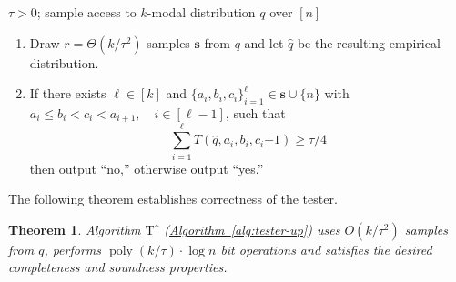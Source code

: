 \documentclass[10pt]{article}
\newtheorem{theorem}{Theorem}[section]
\theoremstyle{definition}
\numberwithin{equation}{section}
\newcommand{\expref}[2]{\texorpdfstring{\hyperref[#2]{#1~\ref{#2}}}{#1~\ref{#2}}}
\newcommand{\algorithml}[1]{{\normalfont\texttt{#1}}}
\newcommand{\poly}{\operatorname{poly}}
\newcommand{\wh}[1]{{\widehat{#1}}}
\newcommand{\TND}{{\mathrm{T^{\uparrow}}}}
\begin{document}
\begin{algorithm}
\medskip
{} $\tau > 0$; sample access to $k$-modal
distribution $q$ over $[n]$

\begin{enumerate}

\item {Draw $r = \Theta(k/\tau^2)$} samples
$\mathbf{s}$ from $q$ and let $\wh{q}$ be the resulting
empirical distribution.

%


\item If there exists $\ell \in [k]$ and $\{a_i, b_i,
    c_i\}_{i=1}^{\ell} \in  \mathbf{s} \cup \{n\}$ with $a_i \le b_i <
    c_i < a_{i+1},\quad i \in [\ell-1]$, such that
\begin{equation} \label{eqn:estimator}
\sum_{i=1}^{\ell} T(\wh{q}, a_i, b_i, c_i  {-1}) \ge \tau/4
\end{equation}
then output ``no,'' otherwise output ``yes.''
\end{enumerate}
\caption{\algorithml{Tester $\TND(\tau)$}}\label{alg:tester-up}
\end{algorithm}


The following theorem establishes correctness of the tester.

\begin{theorem} \label{thm:tester-correctness}
%
Algorithm
$\TND$ (\expref{Algorithm}{alg:tester-up}) uses {$O(k/\tau^2)$} samples from $q$, performs $\poly(k/\tau) \cdot \log n$ bit operations and satisfies the desired completeness and soundness properties.
\end{theorem}
\end{document}
